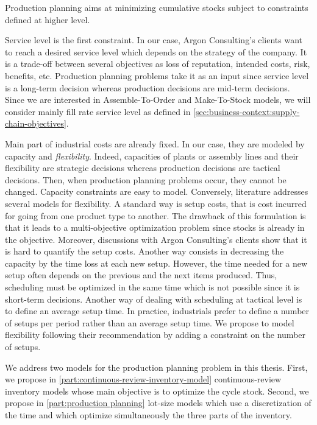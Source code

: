 \medskip


Production planning aims at minimizing cumulative stocks subject to constraints defined at higher level.


Service level is the first constraint.
In our case, Argon Consulting's clients want to reach a desired service level which depends on the strategy of the company.
It is a trade-off between several objectives as loss of reputation, intended costs, risk, benefits, etc.
Production planning problems take it as an input since service level is a long-term decision whereas production decisions are mid-term decisions.
Since we are interested in Assemble-To-Order and Make-To-Stock models, we will consider mainly fill rate service level as defined in \cref{sec:business-context:supply-chain-objectives}.


Main part of industrial costs are already fixed.
In our case, they are modeled by capacity and \emph{flexibility}.
Indeed, capacities of plants or assembly lines and their flexibility are strategic decisions whereas production decisions are tactical decisions.
Then, when production planning problems occur, they cannot be changed.
Capacity constraints are easy to model.
Conversely, literature addresses several models for flexibility.
A standard way is setup costs, that is cost incurred for going from one product type to another.
The drawback of this formulation is that it leads to a multi-objective optimization problem since stocks is already in the objective.
Moreover, discussions with Argon Consulting's clients show that it is hard to quantify the setup costs.
Another way consists in decreasing the capacity by the time loss at each new setup.
However, the time needed for a new setup often depends on the previous and the next items produced.
Thus, scheduling must be optimized in the same time which is not possible since it is short-term decisions.
Another way of dealing with scheduling at tactical level is to define an average setup time.
In practice, industrials prefer to define a number of setups per period rather than an average setup time.
We propose to model flexibility following their recommendation by adding a constraint on the number of setups.


\medskip


We address two models for the production planning problem in this thesis.
First, we propose in \cref{part:continuous-review-inventory-model} continuous-review inventory models whose main objective is to optimize the cycle stock.
Second, we propose in \cref{part:production planning} lot-size models which use a discretization of the time and which optimize simultaneously the three parts of the inventory.



